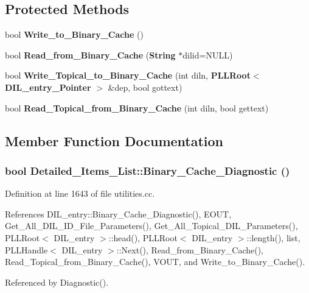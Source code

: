 \subsection*{Protected Methods}
\begin{CompactItemize}
\item 
bool {\bf Write\_\-to\_\-Binary\_\-Cache} ()
\item 
bool {\bf Read\_\-from\_\-Binary\_\-Cache} ({\bf String} $\ast$dilid=NULL)
\item 
bool {\bf Write\_\-Topical\_\-to\_\-Binary\_\-Cache} (int diln, {\bf PLLRoot}$<$ {\bf DIL\_\-entry\_\-Pointer} $>$ \&dep, bool gottext)
\item 
bool {\bf Read\_\-Topical\_\-from\_\-Binary\_\-Cache} (int diln, bool gettext)
\end{CompactItemize}


\subsection{Member Function Documentation}
\subsubsection{\setlength{\rightskip}{0pt plus 5cm}bool Detailed\_\-Items\_\-List::Binary\_\-Cache\_\-Diagnostic ()}\label{classDetailed__Items__List_a6}




Definition at line 1643 of file utilities.cc.

References DIL\_\-entry::Binary\_\-Cache\_\-Diagnostic(), EOUT, Get\_\-All\_\-DIL\_\-ID\_\-File\_\-Parameters(), Get\_\-All\_\-Topical\_\-DIL\_\-Parameters(), PLLRoot$<$ DIL\_\-entry $>$::head(), PLLRoot$<$ DIL\_\-entry $>$::length(), list, PLLHandle$<$ DIL\_\-entry $>$::Next(), Read\_\-from\_\-Binary\_\-Cache(), Read\_\-Topical\_\-from\_\-Binary\_\-Cache(), VOUT, and Write\_\-to\_\-Binary\_\-Cache().

Referenced by Diagnostic().




